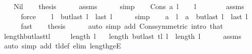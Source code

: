 \begin{isabellebody}
\ \ \isamarkupfalse%
\ Nil\isanewline
\ \ \isamarkupfalse%
\ {\isacharquery}{\kern0pt}thesis\isanewline
\ \ \ \ \isamarkupfalse%
\ assms\isanewline
\ \ \ \ \isamarkupfalse%
\ simp\isanewline
{}\isamarkupfalse%
\isanewline
\ \ \isamarkupfalse%
\ {\isacharparenleft}{\kern0pt}Cons\ a\ l{\isacharparenright}{\kern0pt}\isanewline
\ \ \isamarkupfalse%
\ {\isachardoublequoteopen}l\ {\isasymnoteq}\ {\isacharbrackleft}{\kern0pt}{\isacharbrackright}{\kern0pt}{\isachardoublequoteclose}\isanewline
\ \ \ \ \isamarkupfalse%
\ assms\isanewline
\ \ \ \ \isamarkupfalse%
\ force\isanewline
\ \ \isamarkupfalse%
\ {\isachardoublequoteopen}l\ {\isacharequal}{\kern0pt}\ butlast\ l\ {\isacharat}{\kern0pt}\ {\isacharbrackleft}{\kern0pt}last\ l{\isacharbrackright}{\kern0pt}{\isachardoublequoteclose}\isanewline
\ \ \ \ \isamarkupfalse%
\ simp\isanewline
\ \ \isamarkupfalse%
\ {\isachardoublequoteopen}a\ {\isacharhash}{\kern0pt}\ l\ {\isacharequal}{\kern0pt}\ a\ {\isacharhash}{\kern0pt}\ butlast\ l\ {\isacharat}{\kern0pt}\ {\isacharbrackleft}{\kern0pt}last\ l{\isacharbrackright}{\kern0pt}{\isachardoublequoteclose}\isanewline
\ \ \ \ \isamarkupfalse%
\ fast\isanewline
\ \ \isamarkupfalse%
\ {\isacharquery}{\kern0pt}thesis\isanewline
\ \ \ \ \isamarkupfalse%
\ {\isacharparenleft}{\kern0pt}auto\ simp\ add{\isacharcolon}{\kern0pt}\ Cons{\isacharbrackleft}{\kern0pt}symmetric{\isacharbrackright}{\kern0pt}\ intro{\isacharcolon}{\kern0pt}\ that{\isacharparenright}{\kern0pt}\isanewline
{}\isamarkupfalse%
%
\endisatagproof
{\isafoldproof}%
%
\isadelimproof
\isanewline
%
\endisadelimproof
\isanewline
{}\isamarkupfalse%
\ length{\isacharunderscore}{\kern0pt}butlast{\isacharunderscore}{\kern0pt}tl{\isacharcolon}{\kern0pt}\isanewline
\ \ \ {\isachardoublequoteopen}{}\ {\isasymle}\ length\ l{\isachardoublequoteclose}\isanewline
\ \ \ {\isachardoublequoteopen}length\ {\isacharparenleft}{\kern0pt}butlast\ {\isacharparenleft}{\kern0pt}tl\ l{\isacharparenright}{\kern0pt}{\isacharparenright}{\kern0pt}\ {\isacharequal}{\kern0pt}\ length\ l\ {\isacharminus}{\kern0pt}\ {}{\isachardoublequoteclose}\isanewline
%
\isadelimproof
\ \ %
\endisadelimproof
%
\isatagproof
{}\isamarkupfalse%
\ assms\isanewline
\ \ \isamarkupfalse%
\ {\isacharparenleft}{\kern0pt}auto\ simp\ add{\isacharcolon}{\kern0pt}\ tl{\isacharunderscore}{\kern0pt}def\ elim{\isacharcolon}{\kern0pt}\ length{\isacharunderscore}{\kern0pt}ge{\isacharunderscore}{\kern0pt}{}E{\isacharparenright}{\kern0pt}%

\end{isabellebody}
